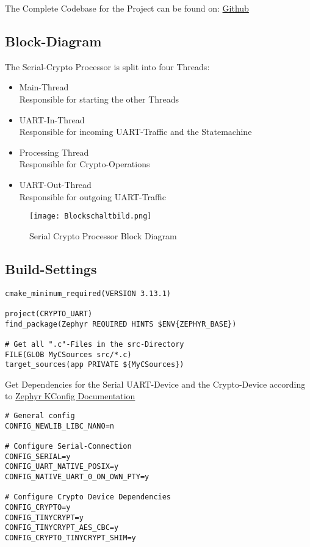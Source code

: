 The Complete Codebase for the Project can be found on:
\href{https://github.com/davirieser/zephyr}
{Github}

\subsection{Block-Diagram}

The Serial-Crypto Processor is split into four Threads:
\begin{itemize}
	\item Main-Thread\\
		Responsible for starting the other Threads
	\item UART-In-Thread\\
		Responsible for incoming UART-Traffic and the Statemachine
	\item Processing Thread\\
		Responsible for Crypto-Operations
	\item UART-Out-Thread\\
		Responsible for outgoing UART-Traffic
\end{itemize}

\begin{figure}[!ht]
	\begin{center}
		\texttt{[image: Blockschaltbild.png]}
		\caption{Serial Crypto Processor Block Diagram}
	\end{center}
\end{figure}

\pagebreak

\subsection{Build-Settings}

\begin{lstlisting}[caption=CMakelists.txt]
cmake_minimum_required(VERSION 3.13.1)

project(CRYPTO_UART)
find_package(Zephyr REQUIRED HINTS $ENV{ZEPHYR_BASE})

# Get all ".c"-Files in the src-Directory
FILE(GLOB MyCSources src/*.c)
target_sources(app PRIVATE ${MyCSources})
\end{lstlisting}

Get Dependencies for the Serial UART-Device and the Crypto-Device
according to
\href{https://docs.zephyrproject.org/2.4.0/reference/kconfig/index-all.html}
{Zephyr KConfig Documentation}

\begin{lstlisting}[caption=prj.conf]
# General config
CONFIG_NEWLIB_LIBC_NANO=n

# Configure Serial-Connection
CONFIG_SERIAL=y
CONFIG_UART_NATIVE_POSIX=y
CONFIG_NATIVE_UART_0_ON_OWN_PTY=y

# Configure Crypto Device Dependencies
CONFIG_CRYPTO=y
CONFIG_TINYCRYPT=y
CONFIG_TINYCRYPT_AES_CBC=y
CONFIG_CRYPTO_TINYCRYPT_SHIM=y
\end{lstlisting}

